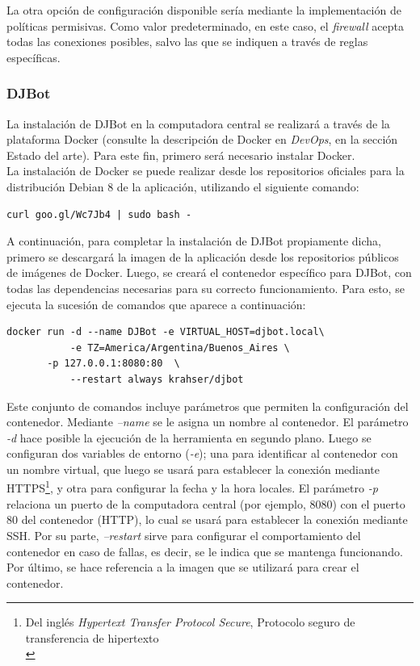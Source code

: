 \documentclass[a4paper,12pt]{article}
\begin{document}
La otra opción de configuración disponible sería mediante la implementación de políticas permisivas. Como valor predeterminado, en este caso, el \emph{firewall} acepta todas las conexiones posibles, salvo las que se indiquen a través de reglas específicas.\\


\subsubsection{DJBot}
\label{sec:orgheadline21}

La instalación de DJBot en la computadora central se realizará a través de la plataforma Docker (consulte la descripción de Docker en \emph{DevOps}, en la sección Estado del arte). Para este fin, primero será necesario instalar Docker.\\

La instalación de Docker se puede realizar desde los repositorios oficiales para la distribución Debian 8 de la aplicación, utilizando el siguiente comando:\\


\begin{verbatim}
curl goo.gl/Wc7Jb4 | sudo bash -
\end{verbatim}

A continuación, para completar la instalación de DJBot propiamente dicha, primero se descargará la imagen de la aplicación desde los repositorios públicos de imágenes de Docker. Luego, se creará el contenedor específico para DJBot, con todas las dependencias necesarias para su correcto funcionamiento. Para esto, se ejecuta la sucesión de comandos que aparece a continuación:

\begin{verbatim}
docker run -d --name DJBot -e VIRTUAL_HOST=djbot.local\
           -e TZ=America/Argentina/Buenos_Aires \
	   -p 127.0.0.1:8080:80  \
           --restart always krahser/djbot
\end{verbatim}
Este conjunto de comandos incluye parámetros que permiten la configuración del contenedor. Mediante \emph{--name} se le asigna un nombre al contenedor. El parámetro \emph{-d} hace posible la ejecución de la herramienta en segundo plano. Luego se configuran dos variables de entorno (\emph{-e}); una para identificar al contenedor con un nombre virtual, que luego se usará para establecer la conexión mediante HTTPS\footnote{Del inglés \emph{Hypertext Transfer Protocol Secure}, Protocolo seguro de transferencia de hipertexto\\}, y otra para configurar la fecha y la hora locales. El parámetro \emph{-p} relaciona un puerto de la computadora central (por ejemplo, 8080) con el puerto 80 del contenedor (HTTP), lo cual se usará para establecer la conexión mediante SSH. Por su parte, \emph{--restart} sirve para configurar el comportamiento del contenedor en caso de fallas, es decir, se le indica que se mantenga funcionando. Por último, se hace referencia a la imagen que se utilizará para crear el contenedor.\\
\end{document}
